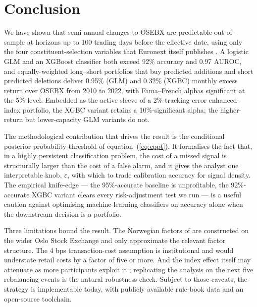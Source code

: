 \section{Conclusion}
\label{sec:conc}

We have shown that semi-annual changes to OSEBX are predictable out-of-sample at horizons up to 100 trading days before the effective date, using only the four constituent-selection variables that Euronext itself publishes \parencite{OSEBX-rule-book}. A logistic GLM \parencite{glm-generalized-linear-models} and an XGBoost classifier \parencite{xgboost-a-scaleable-tree-boosting-system} both exceed 92\% accuracy and 0.97 AUROC, and equally-weighted long--short portfolios that buy predicted additions and short predicted deletions deliver 0.95\% (GLM) and 0.32\% (XGBC) monthly excess return over OSEBX from 2010 to 2022, with Fama--French alphas significant at the 5\% level. Embedded as the active sleeve of a 2\%-tracking-error enhanced-index portfolio, the XGBC variant retains a 10\%-significant alpha; the higher-return but lower-capacity GLM variants do not.

The methodological contribution that drives the result is the conditional posterior probability threshold of equation~(\ref{eq:cppt}). It formalises the fact that, in a highly persistent classification problem, the cost of a missed signal is structurally larger than the cost of a false alarm, and it gives the analyst one interpretable knob, $\varepsilon$, with which to trade calibration accuracy for signal density. The empirical knife-edge --- the 95\%-accurate baseline is unprofitable, the 92\%-accurate XGBC variant clears every risk-adjustment test we run --- is a useful caution against optimising machine-learning classifiers on accuracy alone when the downstream decision is a portfolio.

Three limitations bound the result. The Norwegian factors of \textcite{bernt-fama-french} are constructed on the wider Oslo Stock Exchange and only approximate the relevant factor structure. The 4 bps transaction-cost assumption \parencite{dnb-transaction-costs} is institutional and would understate retail costs by a factor of five or more. And the index effect itself may attenuate as more participants exploit it \parencite{spglobal-what-happened-to-the-index-effect}; replicating the analysis on the next five rebalancing events is the natural robustness check. Subject to those caveats, the strategy is implementable today, with publicly available rule-book data and an open-source toolchain.
